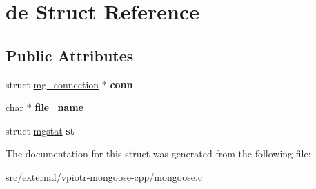 \hypertarget{structde}{\section{de Struct Reference}
\label{structde}
}
\subsection*{Public Attributes}
\begin{DoxyCompactItemize}
\item 
\hypertarget{structde_a6ac99b3d18410e75b174bd2840190aae}{struct \hyperlink{structmg__connection}{mg\-\_\-connection} $\ast$ {\bfseries conn}}\label{structde_a6ac99b3d18410e75b174bd2840190aae}

\item 
\hypertarget{structde_a08f58ddfc5471054734d921fc199b7ed}{char $\ast$ {\bfseries file\-\_\-name}}\label{structde_a08f58ddfc5471054734d921fc199b7ed}

\item 
\hypertarget{structde_a539285efb881b2206fc9ee5467240158}{struct \hyperlink{structmgstat}{mgstat} {\bfseries st}}\label{structde_a539285efb881b2206fc9ee5467240158}

\end{DoxyCompactItemize}


The documentation for this struct was generated from the following file\-:\begin{DoxyCompactItemize}
\item 
src/external/vpiotr-\/mongoose-\/cpp/mongoose.\-c\end{DoxyCompactItemize}
